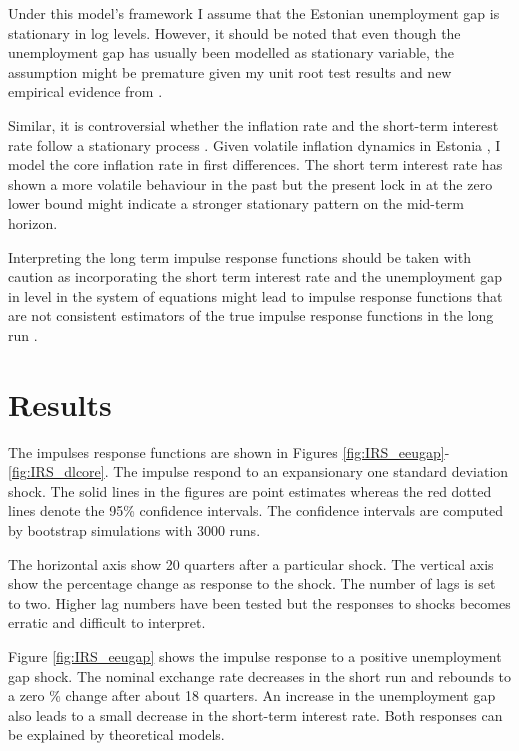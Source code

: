 \documentclass[twoside]{article}
\begin{document}
\begin{multicols}{2}
Under this model's framework I assume that the Estonian unemployment gap is stationary in log levels. However, it should be noted that even though the unemployment gap has usually been modelled as stationary variable, the assumption might be premature given my unit root test results and new empirical evidence from \citep{Gali2015Hysteresis}. 

Similar, it is controversial whether the inflation rate and the short-term interest rate follow a stationary process \citep{Altig2011FirmSpecific,Edge2003Responses}. Given volatile inflation dynamics in Estonia \citep{Masso2005Inflation}, I model the core inflation rate in first differences. The short term interest rate has shown a more volatile behaviour in the past but the present lock in at the zero lower bound might indicate a stronger stationary pattern on the mid-term horizon.     

Interpreting the long term impulse response functions should be taken with caution as incorporating the short term interest rate and the unemployment gap in level in the system of equations might lead to impulse response functions that are not consistent estimators of the true impulse response functions in the long run \citep{Phillips1998Impulse}. 


\section{Results}
\label{Results}

The impulses response functions are shown in Figures \ref{fig:IRS_eeugap}-\ref{fig:IRS_dlcore}. The impulse respond to an expansionary one standard deviation shock. The solid lines in the figures are point estimates whereas the red dotted lines denote the 95\% confidence intervals. The confidence intervals are computed by bootstrap simulations with 3000 runs.   

The horizontal axis show 20 quarters after a particular shock. The vertical axis show the percentage change as response to the shock. The number of lags is set to two. Higher lag numbers have been tested but the responses to shocks becomes erratic and difficult to interpret.


Figure \ref{fig:IRS_eeugap} shows the impulse response to a positive unemployment gap shock. The nominal exchange rate decreases in the short run and rebounds to a zero \% change after about 18 quarters. An increase in the unemployment gap also leads to a small decrease in the short-term interest rate. Both responses can be explained by theoretical models. 


\end{multicols}
\end{document}
